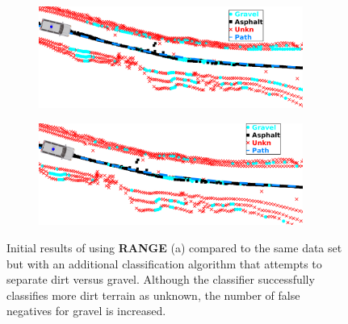 \documentclass[numbered,pdftex]{ohio-etd}
\begin{document}
{{		%
		\begin{figure}[H]
			\centering
			\begin{subfigure}[b]{\textwidth}
				\centering
				\includegraphics[width=0.95\textwidth]{Defense_Images/db1range}
				\caption{}
				\label{fig:db1rangedvg}
			\end{subfigure}
			\vspace{1cm} %
			\begin{subfigure}[b]{\textwidth}
				\centering
				\includegraphics[width=0.95\textwidth]{Defense_Images/db1rangeDVG}
				\caption{}
				\label{fig:db2rangedvg}
			\end{subfigure}
			\caption[Dual Layer Classification]{Initial results of using \textbf{RANGE} (a) compared to the same data set but with an additional classification algorithm that attempts to separate dirt versus gravel. Although the classifier successfully classifies more dirt terrain as unknown, the number of false negatives for gravel is increased. }
			\label{fig:range_raw_v_dvg_example}
		\end{figure}

		
}}
\end{document}
